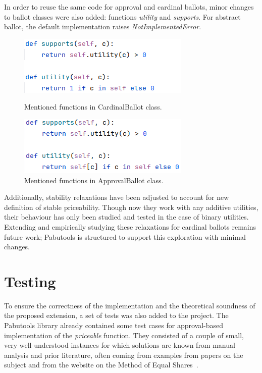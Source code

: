 In order to reuse the same code for approval and cardinal ballots, minor changes to ballot classes were also added: functions \emph{utility} and \emph{supports}. For abstract ballot, the default implementation raises \emph{NotImplementedError}.
\begin{figure}[H]
  \centering
  \begin{minipage}{0.4\textwidth}
    \centering
    \includegraphics[width=\linewidth]{figures/cardinal_utility.png}
    \caption{Mentioned functions in CardinalBallot class.}
    \label{fig:img1}
  \end{minipage}\hfill
  \begin{minipage}{0.4\textwidth}
    \centering
    \includegraphics[width=\linewidth]{figures/approval_utility.png}
    \caption{Mentioned functions in ApprovalBallot class.}
    \label{fig:img2}
  \end{minipage}
\end{figure}

Additionally, stability relaxations have been adjusted to account for new definition of stable priceability. Though now they work with any additive utilities, their behaviour has only been studied and tested in the case of binary utilities. Extending and empirically studying these relaxations for cardinal ballots remains future work; Pabutools is structured to support this exploration with minimal changes.
\section{Testing}
To ensure the correctness of the implementation and the theoretical soundness of the proposed extension, a set of tests was also added to the project. The Pabutools library already contained some test cases for approval-based implementation of the \emph{priceable} function. They consisted of a couple of small, very well-understood instances for which solutions are known from manual analysis and prior literature, often coming from examples from papers on the subject and from the website on the Method of Equal Shares~\cite{EqualSharesWebsite}.

